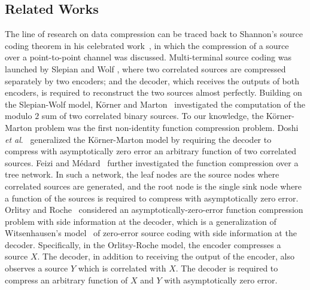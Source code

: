\documentclass[11pt,draftclsnofoot,onecolumn]{IEEEtran}
\begin{document}
\subsection{Related Works}

The line of research on data compression can be traced back to Shannon's source coding theorem in his celebrated work~\cite{Shannon48}, in which the compression of a source  over a point-to-point channel was discussed. Multi-terminal source coding was launched by Slepian and Wolf \cite{Slepian-Wolf-IT73}, where two correlated sources are compressed separately by two encoders; and the decoder, which receives the outputs of both  encoders, is required to reconstruct the two sources almost perfectly. Building on the Slepian-Wolf model, K\"{o}rner and Marton~\cite{Korner-Marton-IT73} investigated the computation of the modulo $2$ sum of two correlated binary sources.
To our knowledge, the K\"{o}rner-Marton problem was the first non-identity function compression problem.
Doshi \textit{et al}.~\cite{Doshi_fun_comp_graph_color_sch}
generalized the K{\"o}rner-Marton model by requiring the decoder to compress with asymptotically zero error an arbitrary function of two correlated sources. Feizi and M{\'e}dard~\cite{Feizi-Medard} further investigated the function compression over a tree network. In such a network, the leaf nodes are the source nodes where correlated sources are generated, and the root node is the single sink node where a
function of the sources is required to compress with asymptotically zero error. Orlitsy and Roche~\cite{Orlitsky-Roche_general_side_inf_model_rat_reg} considered an asymptotically-zero-error function compression problem with side information at the decoder, which is a generalization of Witsenhausen's model~\cite{Witsenhausen-IT-76} of zero-error source coding with side information at the decoder. Specifically, in the Orlitsy-Roche model, the encoder compresses a source $X$. The decoder, in addition to receiving the output of the encoder, also observes a source  $Y$ which is correlated with $X$. The decoder is required to compress an arbitrary function of $X$ and $Y$ with asymptotically zero error.
\end{document}
